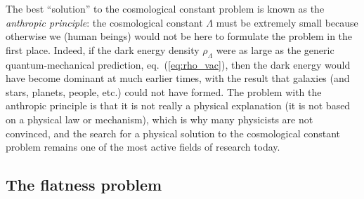 \documentclass[11pt, a4paper,oneside,openright]{book}
\numberwithin{equation}{section}
\begin{document}
The best ``solution'' to the cosmological constant problem is known as the {\it anthropic principle}: the cosmological constant $\Lambda$ must be extremely small because otherwise we (human beings) would not be here to formulate the problem in the first place. Indeed, if the dark energy density $\rho_{\Lambda}$ were as large as the generic quantum-mechanical prediction, eq.\ (\ref{eq:rho_vac}), then the dark energy would have become dominant at much earlier times, with the result that galaxies (and stars, planets, people, etc.) could not have formed. The problem with the anthropic principle is that it is not really a physical explanation (it is not based on a physical law or mechanism), which is why many physicists are not convinced, and the search for a physical solution to the cosmological constant problem remains one of the most active fields of research today.

\subsection{The flatness problem}
\end{document}
